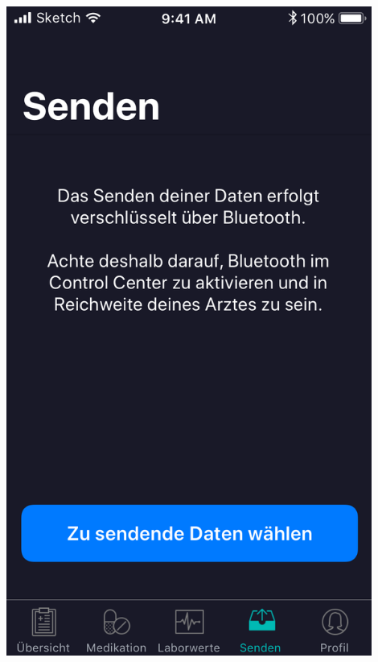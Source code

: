 \documentclass[a4paper]{scrreprt}
\begin{document}
\begin{minipage}[t][][b]{0.4\textwidth}
\includegraphics[width=0.9\textwidth]{mockups/SendTab}
\end{minipage}%
\hfill
\end{document}

